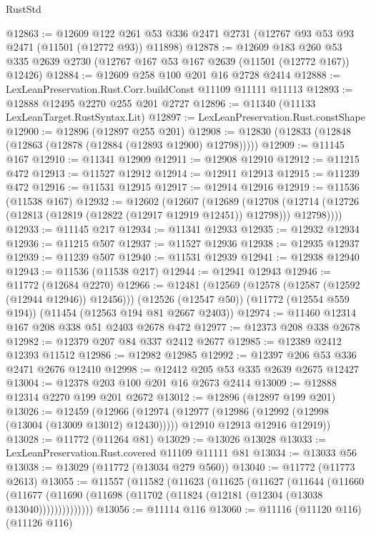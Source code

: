 \begin{lexlean}{RustStd}
\begin{coremodule}
@12863 := @12609
    @122
    @261
    @53
    @336
    @2471
    @2731
    (@12767 @93 @53 @93 @2471 (@11501 (@12772 @93)) @11898)
@12878 := @12609
    @183
    @260
    @53
    @335
    @2639
    @2730
    (@12767 @167 @53 @167 @2639 (@11501 (@12772 @167)) @12426)
@12884 := @12609 @258 @100 @201 @16 @2728 @2414
@12888 := LexLeanPreservation.Rust.Corr.buildConst @11109 @11111 @11113
@12893 := @12888 @12495 @2270 @255 @201 @2727
@12896 := @11340 (@11133 LexLeanTarget.RustSyntax.Lit)
@12897 := LexLeanPreservation.Rust.constShape
@12900 := @12896 (@12897 @255 @201)
@12908 := @12830 (@12833 (@12848 (@12863 (@12878 (@12884 (@12893 @12900) @12798)))))
@12909 := @11145 @167
@12910 := @11341 @12909
@12911 := @12908 @12910
@12912 := @11215 @472
@12913 := @11527 @12912
@12914 := @12911 @12913
@12915 := @11239 @472
@12916 := @11531 @12915
@12917 := @12914 @12916
@12919 := @11536 (@11538 @167)
@12932 := @12602
    (@12607
      (@12689
        (@12708 (@12714 (@12726 (@12813 (@12819 (@12822 (@12917 @12919 @12451)) @12798))) @12798))))
@12933 := @11145 @217
@12934 := @11341 @12933
@12935 := @12932 @12934
@12936 := @11215 @507
@12937 := @11527 @12936
@12938 := @12935 @12937
@12939 := @11239 @507
@12940 := @11531 @12939
@12941 := @12938 @12940
@12943 := @11536 (@11538 @217)
@12944 := @12941 @12943
@12946 := @11772 (@12684 @2270)
@12966 := @12481
    (@12569 (@12578 (@12587 (@12592 (@12944 @12946)) @12456)))
    (@12526 (@12547 @50))
    (@11772 (@12554 @559 @194))
    (@11454 (@12563 @194 @81 @2667 @2403))
@12974 := @11460 @12314 @167 @208 @338 @51 @2403 @2678 @472
@12977 := @12373 @208 @338 @2678
@12982 := @12379 @207 @84 @337 @2412 @2677
@12985 := @12389 @2412 @12393 @11512
@12986 := @12982 @12985
@12992 := @12397 @206 @53 @336 @2471 @2676 @12410
@12998 := @12412 @205 @53 @335 @2639 @2675 @12427
@13004 := @12378 @203 @100 @201 @16 @2673 @2414
@13009 := @12888 @12314 @2270 @199 @201 @2672
@13012 := @12896 (@12897 @199 @201)
@13026 := @12459
    (@12966
      (@12974
        (@12977 (@12986 (@12992 (@12998 (@13004 (@13009 @13012) @12430)))))
        @12910
        @12913
        @12916
        @12919))
@13028 := @11772 (@11264 @81)
@13029 := @13026 @13028
@13033 := LexLeanPreservation.Rust.covered @11109 @11111 @81
@13034 := @13033 @56
@13038 := @13029 (@11772 (@13034 @279 @560))
@13040 := @11772 (@11773 @2613)
@13055 := @11557
    (@11582
      (@11623
        (@11625
          (@11627
            (@11644
              (@11660
                (@11677 (@11690 (@11698 (@11702 (@11824 (@12181 (@12304 (@13038 @13040))))))))))))))
@13056 := @11114 @116
@13060 := @11116 (@11120 @116) (@11126 @116)

\end{coremodule}
\end{lexlean}
